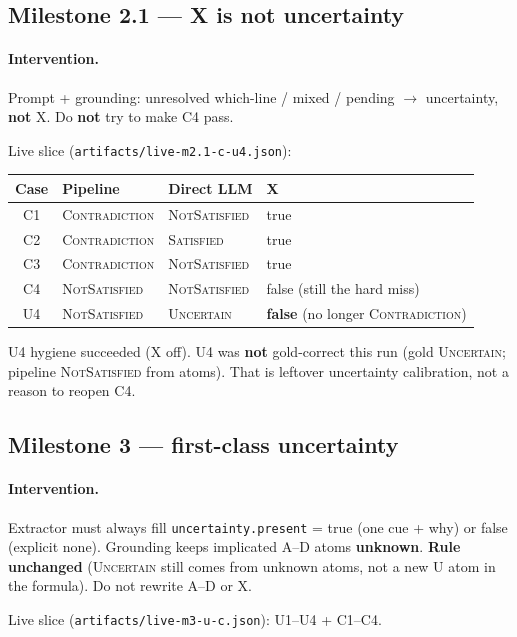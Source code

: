 \documentclass[11pt,a4paper]{article}
\newcommand{\sat}{\textsc{Satisfied}}
\newcommand{\nsat}{\textsc{NotSatisfied}}
\newcommand{\unc}{\textsc{Uncertain}}
\newcommand{\con}{\textsc{Contradiction}}
\begin{document}
\subsection{Milestone 2.1 --- X is not uncertainty}

\paragraph{Intervention.}
Prompt + grounding: unresolved which-line / mixed / pending $\rightarrow$ uncertainty, \textbf{not} X.
Do \textbf{not} try to make C4 pass.

Live slice (\texttt{artifacts/live-m2.1-c-u4.json}):

\begin{center}
\begin{tabular}{@{}c l l l@{}}
\toprule
Case & Pipeline & Direct LLM & X \\
\midrule
C1 & \con & \nsat & true \\
C2 & \con & \sat & true \\
C3 & \con & \nsat & true \\
C4 & \nsat & \nsat & false (still the hard miss) \\
U4 & \nsat & \unc & \textbf{false} (no longer \con) \\
\bottomrule
\end{tabular}
\end{center}

U4 hygiene succeeded (X off).
U4 was \textbf{not} gold-correct this run (gold \unc; pipeline \nsat{} from atoms).
That is leftover uncertainty calibration, not a reason to reopen C4.

\subsection{Milestone 3 --- first-class uncertainty}

\paragraph{Intervention.}
Extractor must always fill \texttt{uncertainty.present} = true (one cue + why) or false (explicit none).
Grounding keeps implicated A--D atoms \textbf{unknown}.
\textbf{Rule unchanged} (\unc{} still comes from unknown atoms, not a new U atom in the formula).
Do not rewrite A--D or X.

Live slice (\texttt{artifacts/live-m3-u-c.json}): U1--U4 + C1--C4.
\end{document}

